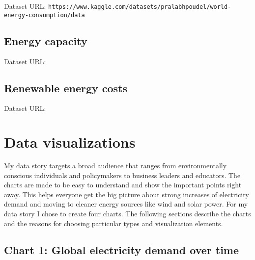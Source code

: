 \documentclass{article}
\begin{document}
Dataset URL: \texttt{https://www.kaggle.com/datasets/pralabhpoudel/world-energy-consumption/data} \newline

\subsection{Energy capacity}

Dataset URL:  \newline

\subsection{Renewable energy costs}

Dataset URL:  \newline

\newpage

\section{Data visualizations}
My data story targets a broad audience that ranges from environmentally conscious individuals and policymakers to business leaders and educators.
The charts are made to be easy to understand and show the important points right away.
This helps everyone get the big picture about strong increases of electricity demand and moving to cleaner energy sources like wind and solar power. \newline
For my data story I chose to create four charts. The following sections describe the charts and the reasons for choosing particular types and visualization elements.

\subsection{Chart 1: Global electricity demand over time}
\end{document}
